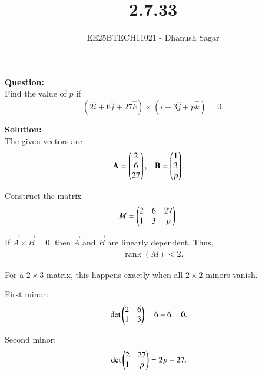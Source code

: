 \documentclass[journal]{IEEEtran}
\begin{document}



\title{2.7.33}
\author{EE25BTECH11021 - Dhanush Sagar
}
{\let\newpage\relax\maketitle}

\renewcommand{\thefigure}{\theenumi}
\renewcommand{\thetable}{\theenumi}
\setlength{\intextsep}{10pt} %


\renewcommand{\thetable}{\theenumi}


\textbf{Question:} \\
Find the value of $p$ if
\[
(2\hat{i} + 6\hat{j} + 27\hat{k}) \times (\hat{i} + 3\hat{j} + p\hat{k}) = 0.
\]



\textbf{Solution:} \\
The given vectors are
\begin{align}
\mathbf{A} &= \begin{pmatrix}2 \\ 6 \\ 27\end{pmatrix}, 
& \mathbf{B} &= \begin{pmatrix}1 \\ 3 \\ p\end{pmatrix}.
\end{align}

Construct the matrix
\begin{align}
M &= \begin{pmatrix}2 & 6 & 27 \\ 1 & 3 & p\end{pmatrix}.
\end{align}

If $\vec{A} \times \vec{B} = 0$, then $\vec{A}$ and $\vec{B}$ are linearly dependent. 
Thus,
\begin{align}
\operatorname{rank}(M) < 2.
\end{align}

For a $2 \times 3$ matrix, this happens exactly when all $2 \times 2$ minors vanish.

First minor:
\begin{align}
\det\begin{pmatrix}2 & 6 \\ 1 & 3\end{pmatrix} &= 6 - 6 = 0.
\end{align}

Second minor:
\begin{align}
\det\begin{pmatrix}2 & 27 \\ 1 & p\end{pmatrix} &= 2p - 27.
\end{align}
\end{document}
